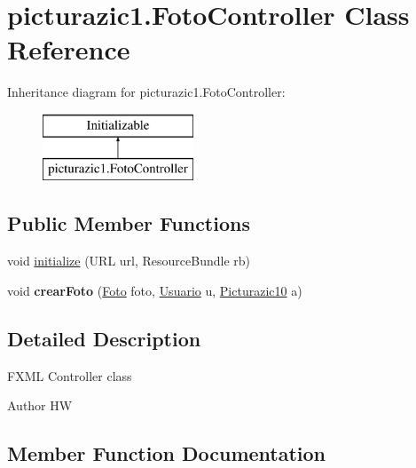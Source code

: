 \hypertarget{classpicturazic1_1_1_foto_controller}{}\section{picturazic1.\+Foto\+Controller Class Reference}
\label{classpicturazic1_1_1_foto_controller}
Inheritance diagram for picturazic1.\+Foto\+Controller\+:\begin{figure}[H]
\begin{center}
\leavevmode
\includegraphics[height=2.000000cm]{classpicturazic1_1_1_foto_controller}
\end{center}
\end{figure}
\subsection*{Public Member Functions}
\begin{DoxyCompactItemize}
\item 
void \mbox{\hyperlink{classpicturazic1_1_1_foto_controller_a3703f1afb84525455d11c18c49dc0499}{initialize}} (U\+RL url, Resource\+Bundle rb)
\item 
\mbox{\label{classpicturazic1_1_1_foto_controller_a05c242e320f8c6e4221b9ed027afc355}} 
void {\bfseries crear\+Foto} (\mbox{\hyperlink{classmodelo_1_1_foto}{Foto}} foto, \mbox{\hyperlink{classmodelo_1_1_usuario}{Usuario}} u, \mbox{\hyperlink{classpicturazic1_1_1_picturazic10}{Picturazic10}} a)
\end{DoxyCompactItemize}


\subsection{Detailed Description}
F\+X\+ML Controller class

\begin{DoxyAuthor}{Author}
HW 
\end{DoxyAuthor}


\subsection{Member Function Documentation}
\mbox{\label{classpicturazic1_1_1_foto_controller_a3703f1afb84525455d11c18c49dc0499}} 
